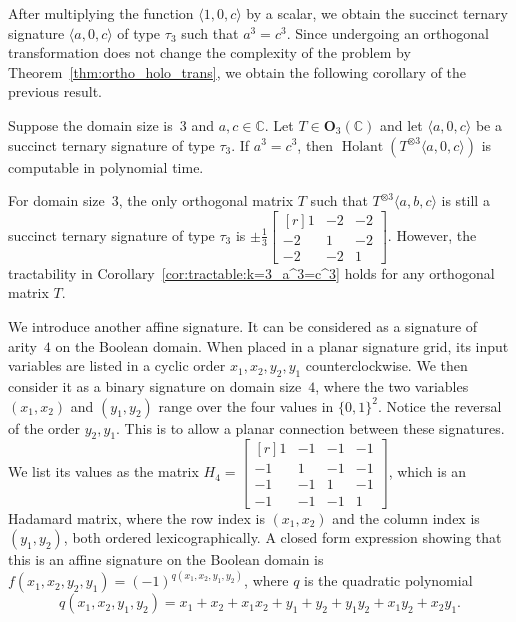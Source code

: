 \documentclass[11pt]{article}
\newcommand{\Holant}{\operatorname{Holant}}
\begin{document}
After multiplying the function $\langle 1,0,c \rangle$ by a scalar,
we obtain the succinct ternary signature $\langle a,0,c \rangle$ of type $\tau_3$ such that $a^3 = c^3$.
Since undergoing an orthogonal transformation does not change the complexity of the problem by Theorem~\ref{thm:ortho_holo_trans},
we obtain the following corollary of the previous result.

\begin{corollary} \label{cor:tractable:k=3_a^3=c^3}
 Suppose the domain size is~$3$ and $a,c \in \mathbb{C}$.
 Let $T \in \mathbf{O}_3(\mathbb{C})$ and let $\langle a,0,c \rangle$ be a succinct ternary signature of type $\tau_3$.
 If $a^3 = c^3$,
 then $\Holant(T^{\otimes 3} \langle a,0,c \rangle)$ is computable in polynomial time.
\end{corollary}

For domain size~$3$,
the only orthogonal matrix $T$ such that $T^{\otimes 3} \langle a,b,c \rangle$
is still a succinct ternary signature of type $\tau_3$ is
$\pm \frac{1}{3} \left[\begin{smallmatrix*}[r] 1 & -2 & -2 \\ -2 & 1 & -2 \\ -2 & -2 & 1 \end{smallmatrix*}\right]$.
However, the tractability in Corollary~\ref{cor:tractable:k=3_a^3=c^3} holds for any orthogonal matrix $T$.

We introduce another affine signature.
It can be considered as a signature of arity~$4$ on the Boolean domain.
When placed in a planar signature grid,
its input variables are listed in a cyclic order $x_1, x_2, y_2, y_1$ counterclockwise.
We then consider it as a binary signature on domain size~$4$,
where the two variables $(x_1, x_2)$ and $(y_1, y_2)$ range over the four values in $\{0,1\}^2$.
Notice the reversal of the order $y_2, y_1$.
This is to allow a planar connection between these signatures.
We list its values as the matrix
$H_4 = \left[\begin{smallmatrix*}[r] 1 & -1 & -1 & -1 \\ -1 & 1 & -1 & -1 \\ -1 & -1 & 1 & -1 \\ -1 & -1 & -1 & 1 \end{smallmatrix*}\right]$,
which is an Hadamard matrix,
where the row index is $(x_1, x_2)$ and the column index is $(y_1, y_2)$,
both ordered lexicographically.
A closed form expression showing that this is an affine signature on the Boolean domain is
$f(x_1, x_2, y_2, y_1) = (-1)^{q(x_1, x_2, y_1, y_2)}$,
where $q$ is the quadratic polynomial
\begin{equation} \label{equ:prelim:affine:quad_poly}
 q(x_1, x_2, y_1, y_2) = x_1 + x_2 + x_1 x_2 + y_1 + y_2 + y_1 y_2 +x_1 y_2 + x_2 y_1.
\end{equation}
\end{document}

